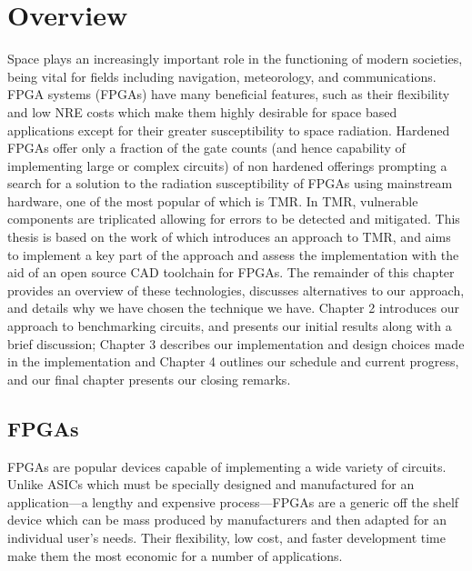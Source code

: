 \documentclass[12pt,final,oneside]{dwThesis} %
\begin{document}
\section{Overview}
Space plays an increasingly important role in the functioning of modern societies, being vital for fields including navigation, meteorology, and communications\cite{OECDSpace}. \acl{FPGA} systems (\acsp{FPGA}) have many beneficial features, such as their flexibility and low \ac{NRE} costs which make them highly desirable for space based applications except for their greater susceptibility to space radiation. Hardened \acp{FPGA} offer only a fraction of the gate counts (and hence capability of implementing large or complex circuits) of non hardened offerings prompting a search for a solution to the radiation susceptibility of \acp{FPGA} using mainstream hardware\cite{VFPGATMR}, one of the most popular of which is \ac{TMR}. In \ac{TMR}, vulnerable components are triplicated allowing for errors to be detected and mitigated. This thesis is based on the work of\cite{DiesselChange} which introduces an approach to \ac{TMR}, and aims to implement a key part of the approach and assess the implementation with the aid of an open source \ac{CAD} toolchain for \acp{FPGA}.
The remainder of this chapter provides an overview of these technologies, discusses alternatives to our approach, and details why we have chosen the technique we have. Chapter 2 introduces our approach to benchmarking circuits, and presents our initial results along with a brief discussion; Chapter 3 describes our implementation and design choices made in the implementation and Chapter 4 outlines our schedule and current progress, and our final chapter presents our closing remarks.
\acresetall
\subsection{\acsp{FPGA}}
\acp{FPGA} are popular devices capable of implementing a wide variety of circuits. Unlike \acp{ASIC} which must be specially designed and manufactured for an application---a lengthy and expensive process---\acp{FPGA} are a generic off the shelf device which can be mass produced by manufacturers and then adapted for an individual user's needs. Their flexibility, low cost, and faster development time make them the most economic for a number of applications.
\end{document}
